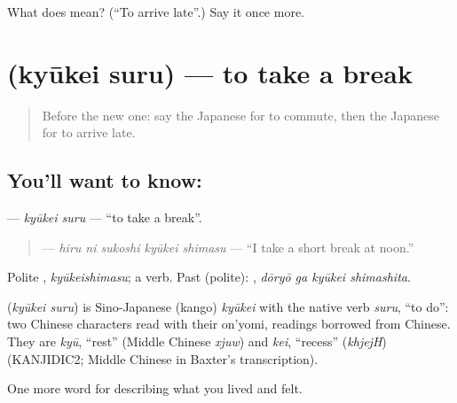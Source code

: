 \begin{tcolorbox}[breakable,colback=teal!4,colframe=teal!35!black,title={Before you move on}]
What does  mean? (\textquotedblleft{}To arrive late\textquotedblright{}.) Say it once more.
\end{tcolorbox}
\section[\texorpdfstring{\ja{きゅうけいする} (kyūkei suru)}{きゅうけいする (kyūkei suru)}]{ (kyūkei suru) — to take a break}

\label{lesson:JA-C451-kyuukei-suru}



\begin{quote}
Before the new one: say the Japanese for to commute, then the Japanese for to arrive late.
\end{quote}

\subsection*{You'll want to know: }
\textbf{} — \emph{kyūkei suru} — \textquotedblleft{}to take a break\textquotedblright{}.

\begin{quote}
\textbf{  } — \emph{hiru ni sukoshi kyūkei shimasu} — \textquotedblleft{}I take a short break at noon.\textquotedblright{}
\end{quote}

Polite \textbf{}, \emph{kyūkeishimasu}; a  verb. Past (polite): \textbf{ }, \emph{dōryō ga kyūkei shimashita}.

\begin{cousinweb}
\textbf{} (\emph{kyūkei suru}) is Sino-Japanese (kango) \emph{kyūkei} with the native verb \emph{suru}, \textquotedblleft{}to do\textquotedblright{}: two Chinese characters read with their on'yomi, readings borrowed from Chinese. They are \emph{kyū}, \textquotedblleft{}rest\textquotedblright{} (Middle Chinese \emph{xjuw}) and \emph{kei}, \textquotedblleft{}recess\textquotedblright{} (\emph{khjejH}) (KANJIDIC2; Middle Chinese in Baxter's transcription).
\end{cousinweb}

\begin{grammarlens}[title={What you've built}]
One more word for describing what you lived and felt.
\end{grammarlens}

